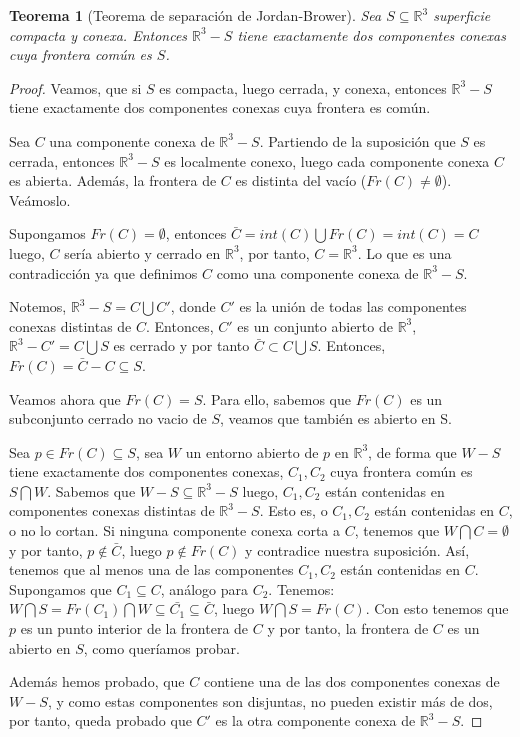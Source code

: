\documentclass[paper=a4, fontsize=11pt, spanish]{scrartcl}
\newcommand{\rtres}{\mathbb{R}^3}
\newtheorem{theorem}{Teorema}[section]
\theoremstyle{definition}
\theoremstyle{definition}
\theoremstyle{definition}
\begin{document}
\begin{theorem}[Teorema de separación de Jordan-Brower]
Sea $S \subseteq \rtres$ superficie compacta y conexa. Entonces $\rtres - S$ tiene exactamente dos componentes conexas cuya frontera común es $S$.
\end{theorem}
\begin{proof}
Veamos, que si $S$ es compacta, luego cerrada, y conexa, entonces $\rtres - S$ tiene exactamente dos componentes conexas cuya frontera es común.

Sea $C$ una componente conexa de $\rtres - S$. Partiendo de la suposición que $S$ es cerrada, entonces $\rtres - S$ es localmente conexo, luego cada componente conexa $C$ es abierta. Además, la frontera de $C$ es distinta del vacío ($Fr(C) \neq \emptyset$). Veámoslo.

Supongamos $Fr(C) = \emptyset$, entonces $\bar{C} = int(C)\bigcup Fr(C)=int(C)=C$ luego, $C$ sería abierto y cerrado en $\rtres$, por tanto, $C=\rtres$. Lo que es una contradicción ya que definimos $C$ como una componente conexa de $\rtres - S$.

Notemos, $\rtres - S = C \bigcup C'$, donde $C'$ es la unión de todas las componentes conexas distintas de $C$. Entonces, $C'$ es un conjunto abierto de $\rtres$, $\rtres - C' = C \bigcup S$ es cerrado y por tanto $\bar{C} \subset C\bigcup S$. Entonces, $Fr(C)=\bar{C}-C \subseteq S$.


Veamos ahora que $Fr(C) = S$. Para ello, sabemos que $Fr(C)$ es un subconjunto cerrado no vacio de $S$, veamos que también es abierto en S.

Sea $p \in Fr(C) \subseteq S$, sea $W$ un entorno abierto de $p$ en $\rtres$, de forma que $W-S$ tiene exactamente dos componentes conexas, $C_1, C_2$ cuya frontera común es $S \bigcap W$. Sabemos que $W-S \subseteq \rtres - S$ luego, $C_1, C_2$ están contenidas en componentes conexas distintas de $\rtres - S$. Esto es, o $C_1, C_2$ están contenidas en $C$, o no lo cortan. Si ninguna componente conexa corta a $C$, tenemos que $W\bigcap C = \emptyset$ y por tanto, $p \notin \bar{C}$, luego $p \notin Fr(C)$ y contradice nuestra suposición. Así, tenemos que al menos una de las componentes $C_1, C_2$ están contenidas en $C$. Supongamos que $C_1 \subseteq C$, análogo para $C_2$. Tenemos: $W \bigcap S = Fr(C_1) \bigcap W \subseteq \bar{C_1} \subseteq \bar{C}$, luego $W \bigcap S= Fr(C)$. Con esto tenemos que $p$ es un punto interior de la frontera de $C$ y por tanto, la frontera de $C$ es un abierto en $S$, como queríamos probar.

Además hemos probado, que $C$ contiene una de las dos componentes conexas de $W-S$, y como estas componentes son disjuntas, no pueden existir más de dos, por tanto, queda probado que $C'$ es la otra componente conexa de $\rtres - S$.

\end{proof}
\end{document}

